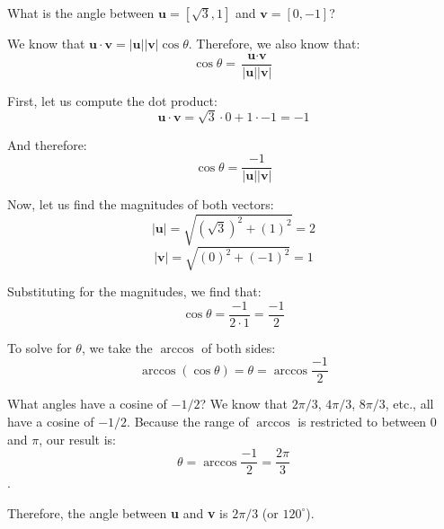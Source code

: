 \begin{Worked}
\begin{Problem}
What is the angle between $\textbf{u} = \left[ \sqrt{3}, 1 
\right]$ and $\textbf{v} = \left[ 0, -1 \right]$?
\end{Problem}
\begin{Solution}
We know that $\textbf{u} \cdot \textbf{v} = \left| 
\textbf{u} \right| \left| \textbf{v} \right| \cos{\theta}$. Therefore, we also 
know that:
$$\cos{\theta} = \frac{\textbf{u} \cdot \textbf{v}}{\left| \textbf{u} \right| 
\left| \textbf{v} \right|}$$

First, let us compute the dot product:
$$\textbf{u} \cdot \textbf{v} = \sqrt{3} \cdot 0 + 1 \cdot -1 = -1$$

And therefore:
$$\cos{\theta} = \frac{-1}{\left| \textbf{u} \right| \left| \textbf{v} 
\right|}$$

Now, let us find the magnitudes of both vectors:
$$\left| \textbf{u} \right| = \sqrt{\left( \sqrt{3} \right)^2 + \left( 1 
\right)^2} = 2$$
$$\left| \textbf{v} \right| = \sqrt{\left( 0 \right)^2 + \left( -1 \right)^2} 
= 1$$

Substituting for the magnitudes, we find that:
$$\cos{\theta} = \frac{-1}{2 \cdot 1} = \frac{-1}{2}$$

To solve for $\theta$, we take the $\arccos$ of both sides:
$$\arccos{ \left( \cos{\theta} \right)} = \theta = \arccos{ \frac{-1}{2} }$$

What angles have a cosine of $-1 / 2$? We know that $2\pi / 3$, $4 \pi / 3$, 
$8 \pi / 3$, etc., all have a cosine of $-1 / 2$. Because the range of 
$\arccos$ is restricted to between $0$ and $\pi$, our result is:
$$\theta = \arccos{ \frac{-1}{2}} = \frac{2\pi}{3}$$.

Therefore, the angle between \textbf{u} and \textbf{v} is $2\pi / 3$ (or $120^{
\circ}$).
\end{Solution}
\end{Worked}

